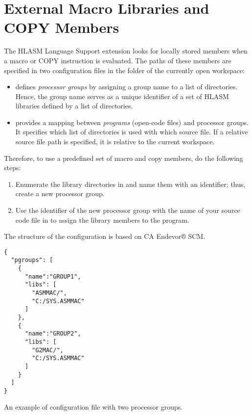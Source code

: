 \section{External Macro Libraries and COPY Members}
\label{sec:configuration}

The HLASM Language Support extension looks for locally stored members when a macro or COPY instruction is evaluated. The paths of these members are specified in two configuration files in the  folder of the currently open workspace:
\begin{itemize}
	\item  {} defines \emph{processor groups} by assigning a group name to a list of directories. Hence, the group name serves as a unique identifier of a set of HLASM libraries defined by a list of directories.
	
	
	\item  {} provides a mapping between \emph{programs} (open-code files) and processor groups. It specifies which list of directories is used with which source file. If a relative source file path is specified, it is relative to the current workspace.
\end{itemize}

Therefore, to use a predefined set of macro and copy members, do the following steps: 
\begin{enumerate}
	\item Enumerate the library directories in  and name them with an identifier; thus, create a new processor group.
	\item Use the identifier of the new processor group with the name of your source code file in  to assign the library members to the program.
\end{enumerate}

The structure of the configuration is based on CA Endevor® SCM.


\begin{listing}
	\begin{verbatim}
{
  "pgroups": [
    {
      "name":"GROUP1",
      "libs": [
        "ASMMAC/",
        "C:/SYS.ASMMAC"
      ]
    },
    {
      "name":"GROUP2",
      "libs": [
        "G2MAC/",
        "C:/SYS.ASMMAC"
      ]
    }
  ]
}
	\end{verbatim}
	\caption{An example of  configuration file with two processor groups.}
	\label{lst:ex1}
\end{listing}

